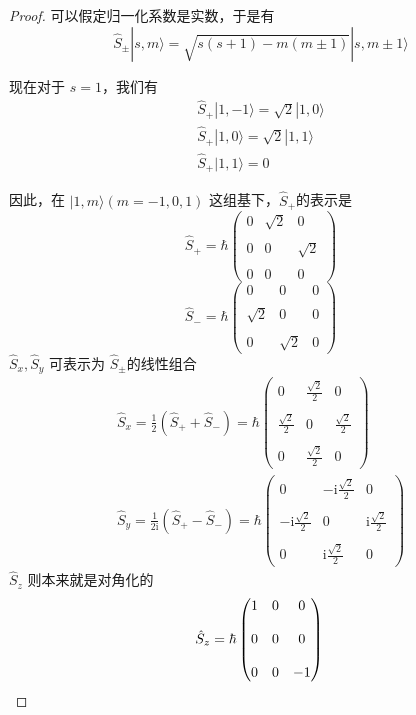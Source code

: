 \begin{proof}
可以假定归一化系数是实数，于是有
$$\hat{S}_{ \pm}|s, m\rangle=\sqrt{s(s+1)-m(m \pm 1)}|s, m \pm 1\rangle$$

现在对于 $s=1$，我们有
$$
\begin{gathered}
\hat{S}_{+}|1,-1\rangle=\sqrt{2}|1,0\rangle \\
\hat{S}_{+}|1,0\rangle=\sqrt{2}|1,1\rangle \\
\hat{S}_{+}|1,1\rangle=0
\end{gathered}
$$

因此，在 $|1, m\rangle(m=-1,0,1)$ 这组基下，$\hat{S}_{+}$的表示是
$$\hat{S}_{+}=\hbar\begin{pmatrix}
0 & \sqrt{2} & 0 \\ \\
0 & 0 & \sqrt{2} \\ \\
0 & 0 & 0
\end{pmatrix}$$
$$\hat{S}_{-}=\hbar\begin{pmatrix}
0 & 0 & 0 \\ \\
\sqrt{2} & 0 & 0 \\ \\
0 & \sqrt{2} & 0
\end{pmatrix}$$
$\hat{S}_{x}, \hat{S}_{y}$ 可表示为 $\hat{S}_{ \pm}$的线性组合
$$
\begin{gathered}
\hat{S}_{x}=\frac{1}{2}\left(\hat{S}_{+}+\hat{S}_{-}\right)
=\hbar\begin{pmatrix}
0 & \frac{\sqrt{2}}{2} & 0 \\ \\
\frac{\sqrt{2}}{2} & 0 & \frac{\sqrt{2}}{2} \\ \\
0 & \frac{\sqrt{2}}{2} & 0
\end{pmatrix} \\
\hat{S}_{y}=\frac{1}{2 \mathrm{i}}\left(\hat{S}_{+}-\hat{S}_{-}\right)
=\hbar\begin{pmatrix}
0 & -\mathrm{i} \frac{\sqrt{2}}{2} & 0 \\ \\
-\mathrm{i} \frac{\sqrt{2}}{2} & 0 & \mathrm{i} \frac{\sqrt{2}}{2} \\ \\
0 & \mathrm{i} \frac{\sqrt{2}}{2} & 0
\end{pmatrix}
\end{gathered}
$$
$\hat{S}_{z}$ 则本来就是对角化的
$$\hat{S}_{z}=\hbar\begin{pmatrix}
1 & 0 & 0 \\ \\
0 & 0 & 0 \\ \\
0 & 0 & -1
\end{pmatrix}\qedhere$$
\end{proof}
